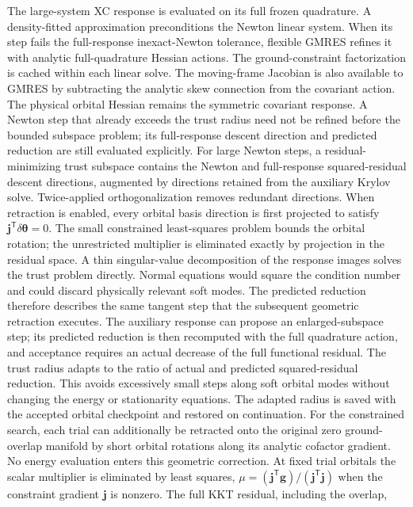 \documentclass[11pt,a4paper]{article}
\begin{document}
The large-system XC response is evaluated on its full frozen quadrature.
A density-fitted approximation preconditions the Newton linear system.
When its step fails the full-response inexact-Newton tolerance, flexible
GMRES refines it with analytic full-quadrature Hessian actions. The
ground-constraint factorization is cached within each linear solve.
The moving-frame Jacobian is also available to GMRES by subtracting the
analytic skew connection from the covariant action. The physical orbital
Hessian remains the symmetric covariant response. A Newton step that
already exceeds the trust radius need not be refined before the bounded
subspace problem; its full-response descent direction and predicted
reduction are still evaluated explicitly. For
large Newton steps, a residual-minimizing trust subspace contains the
Newton and full-response squared-residual descent directions, augmented
by directions retained from the auxiliary Krylov solve. Twice-applied
orthogonalization removes redundant directions. When retraction is enabled, every orbital basis direction is first
projected to satisfy $\mathbf j^{\mathsf T}\delta\boldsymbol\theta=0$.
The small constrained least-squares problem bounds the orbital rotation;
the unrestricted multiplier is eliminated exactly by projection in the
residual space. A thin singular-value decomposition of the response
images solves the trust problem directly. Normal equations would square
the condition number and could discard physically relevant soft modes.
The predicted reduction therefore describes the same tangent step that
the subsequent geometric retraction executes. The auxiliary response can
propose an enlarged-subspace step; its predicted reduction is then
recomputed with the full quadrature action, and acceptance requires an
actual decrease of the full functional residual. The trust radius adapts
to the ratio of actual and predicted squared-residual reduction. This
avoids excessively small steps along soft orbital modes without changing
the energy or stationarity equations. The adapted radius is saved with
the accepted orbital checkpoint and restored on continuation.
For the constrained search, each trial can additionally be retracted onto
the original zero ground-overlap manifold by short orbital rotations
along its analytic cofactor gradient. No energy evaluation enters this
geometric correction. At fixed trial orbitals the scalar multiplier is
eliminated by least squares, $\mu=(\mathbf j^{\mathsf T}\mathbf g)/
(\mathbf j^{\mathsf T}\mathbf j)$ when the constraint gradient
$\mathbf j$ is nonzero. The full KKT residual, including the overlap,
\end{document}
